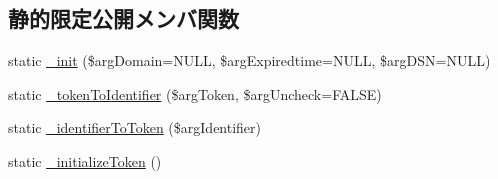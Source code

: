 \subsection*{静的限定公開メンバ関数}
\begin{DoxyCompactItemize}
\item 
static \hyperlink{class_session_memcache_a839fb6db0500fac5d5f23013e19c639d}{\+\_\+init} (\$arg\+Domain=N\+U\+L\+L, \$arg\+Expiredtime=N\+U\+L\+L, \$arg\+D\+S\+N=N\+U\+L\+L)
\item 
static \hyperlink{class_session_memcache_ad3c8b5a5b44b9d986e7b114c436315f8}{\+\_\+token\+To\+Identifier} (\$arg\+Token, \$arg\+Uncheck=F\+A\+L\+S\+E)
\item 
static \hyperlink{class_session_memcache_a33e8d01478a704ea3fe13a2b9518f36e}{\+\_\+identifier\+To\+Token} (\$arg\+Identifier)
\item 
static \hyperlink{class_session_memcache_a275f5f659d2fe68d2daa188ef77eb7b9}{\+\_\+initialize\+Token} ()
\end{DoxyCompactItemize}
